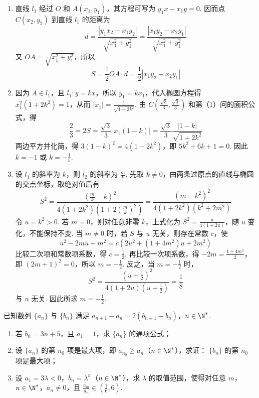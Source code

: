 \begin{solution}
\begin{enumerate}
\item 直线 \(l_{1}\) 经过 \(O\) 和 \(A(x_{1},y_{1})\)，其方程可写为 \(y_{1}x-x_{1}y=0\). 因而点 \(C(x_{2},y_{2})\) 到直线 \(l_{1}\) 的距离为
\[
d=\frac{|y_{1}x_{2}-x_{1}y_{2}|}{\sqrt{x_{1}^{2}+y_{1}^{2}}}=\frac{|x_{1}y_{2}-x_{2}y_{1}|}{\sqrt{x_{1}^{2}+y_{1}^{2}}}
\]
又 \(OA=\sqrt{x_{1}^{2}+y_{1}^{2}}\)，所以
\[
S=\frac{1}{2}OA\cdot d=\frac{1}{2}|x_{1}y_{2}-x_{2}y_{1}|
\]
\item 因为 \(A\in l_{1}\)，且 \(l_{1}:y=kx\)，所以 \(y_{1}=kx_{1}\)，代入椭圆方程得 \(x_{1}^{2}(1+2k^{2})=1\)，从而 \(|x_{1}|=\frac{1}{\sqrt{1+2k^{2}}}\). 由 \(C\left(\frac{\sqrt{3}}{3},\frac{\sqrt{3}}{3}\right)\) 和第（1）问的面积公式，得
\[
\frac{2}{3}=2S=\frac{\sqrt{3}}{3}|x_{1}(1-k)|=\frac{\sqrt{3}}{3}\frac{|1-k|}{\sqrt{1+2k^{2}}}
\]
两边平方并化简，得 \(3(1-k)^{2}=4(1+2k^{2})\)，即 \(5k^{2}+6k+1=0\). 因此 \(k=-1\) 或 \(k=-\frac{1}{5}\).
\item 设 \(l_{1}\) 的斜率为 \(k\)，则 \(l_{2}\) 的斜率为 \(\frac{m}{k}\). 先取 \(k\neq0\)，由两条过原点的直线与椭圆的交点坐标，取绝对值后有
\[
S^{2}=\frac{\left(\frac{m}{k}-k\right)^{2}}{4(1+2k^{2})\left(1+2\left(\frac{m}{k}\right)^{2}\right)}=\frac{(m-k^{2})^{2}}{4(1+2k^{2})(k^{2}+2m^{2})}
\]
令 \(u=k^{2}>0\). 若 \(m=0\)，则对任意非零 \(k\)，上式化为 \(S^{2}=\frac{u}{4(1+2u)}\)，随 \(u\) 变化，不能保持不变. 当 \(m\neq0\) 时，若 \(S\) 与 \(u\) 无关，则存在常数 \(c\)，使
\[
u^{2}-2mu+m^{2}=c\left(2u^{2}+(1+4m^{2})u+2m^{2}\right)
\]
比较二次项和常数项系数，得 \(c=\frac{1}{2}\). 再比较一次项系数，得 \(-2m=\frac{1+4m^{2}}{2}\)，即 \((2m+1)^{2}=0\)，所以 \(m=-\frac{1}{2}\). 反之，当 \(m=-\frac{1}{2}\) 时，
\[
S^{2}=\frac{\left(u+\frac{1}{2}\right)^{2}}{4(1+2u)\left(u+\frac{1}{2}\right)}=\frac{1}{8}
\]
与 \(u\) 无关. 因此所求 \(m=-\frac{1}{2}\).
\end{enumerate}
\end{solution}

\begin{problem}
已知数列 \(\{a_{n}\}\) 与 \(\{b_{n}\}\) 满足 \(a_{n + 1} - a_n = 2(b_{n + 1} - b_n)\)，\(n \in \N^*\).
\begin{enumerate}
\item 若 \( b_{n} = 3n + 5 \)，且 \( a_{1} = 1 \)，求 \( \{a_{n}\} \) 的通项公式；
\item 设 \(\{a_{n}\}\) 的第 \(n_0\) 项是最大项，即 \(a_{n_0} \geqslant a_n\)（\(n \in \N^*\)），求证： \(\{b_n\}\) 的第 \(n_0\) 项是最大项；
\item 设 \(a_{1} = 3\lambda < 0\)，\(b_{n} = \lambda^{n}\)（\(n \in \N^{*}\)），求 \(\lambda\) 的取值范围，使得对任意 \(m\)，\(n \in \N^{*}\)，\(a_{n} \neq 0\)，且 \(\frac{a_{m}}{a_{n}} \in \left(\frac{1}{6}, 6\right)\).
\end{enumerate}
\end{problem}

